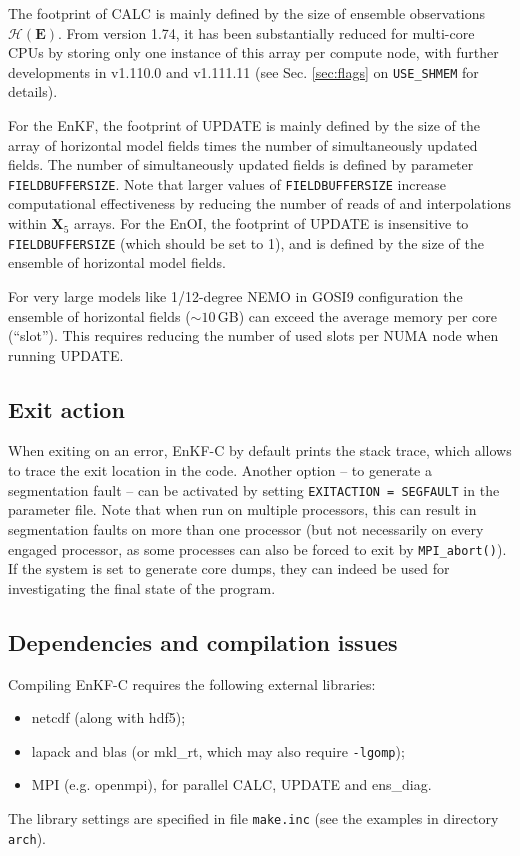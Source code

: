 \documentclass[11pt]{report}
\newcommand{\mb} {\mathbf}
\begin{document}
The footprint of CALC is mainly defined by the size of ensemble observations $\mathcal H(\mb E)$.
From version 1.74, it has been substantially reduced for multi-core CPUs by storing only one instance of this array per compute node, with further developments in v1.110.0 and v1.111.11 (see Sec. \ref{sec:flags} on \verb|USE_SHMEM| for details).

For the EnKF, the footprint of UPDATE is mainly defined by the size of the array of horizontal model fields times the number of simultaneously updated fields.
The number of simultaneously updated fields is defined by parameter \verb|FIELDBUFFERSIZE|.
Note that larger values of \verb|FIELDBUFFERSIZE| increase computational effectiveness by reducing the number of reads of and interpolations within $\mb X_5$ arrays.
For the EnOI, the footprint of UPDATE is insensitive to \verb|FIELDBUFFERSIZE| (which should be set to 1), and is defined by the size of the ensemble of horizontal model fields.

For very large models like 1/12-degree NEMO in GOSI9 configuration the ensemble of horizontal fields ($\sim 10$\,GB) can exceed the average memory per core (``slot'').
This requires reducing the number of used slots per NUMA node when running UPDATE.

\subsection{Exit action}

When exiting on an error, EnKF-C by default prints the stack trace, which allows to trace the exit location in the code.
Another option -- to generate a segmentation fault -- can be activated by setting \verb|EXITACTION = SEGFAULT| in the parameter file.
Note that when run on multiple processors, this can result in segmentation faults on more than one processor (but not necessarily on every engaged processor, as some processes can also be forced to exit by \verb|MPI_abort()|).
If the system is set to generate core dumps, they can indeed be used for investigating the final state of the program.

\subsection{Dependencies and compilation issues}

Compiling EnKF-C requires the following external libraries:
\begin{itemize}
\item netcdf (along with hdf5);
\item lapack and blas (or mkl\_rt, which may also require \verb|-lgomp|);
\item MPI (e.g. openmpi), for parallel CALC, UPDATE and ens\_diag.
\end{itemize}
The library settings are specified in file \verb|make.inc| (see the examples in directory \verb|arch|).
\end{document}
